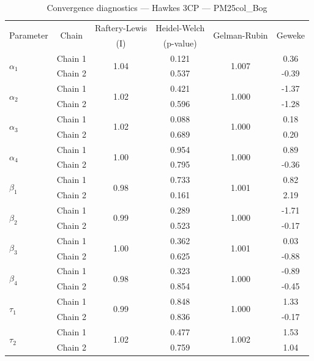 \begin{table}[H]
\centering
\caption{Convergence diagnostics — Hawkes 3CP — PM25col_Bog}
\begin{tabular}{lccccc}
\toprule
\multirow{2}{*}{Parameter} & \multirow{2}{*}{Chain} & Raftery-Lewis & Heidel-Welch & \multirow{2}{*}{Gelman-Rubin} & \multirow{2}{*}{Geweke} \\
 & & (I) & (p-value) & & (z) \\
\midrule
\multirow{2}{*}{$\alpha_1$} & Chain 1 & \multirow{2}{*}{1.04} & 0.121 & \multirow{2}{*}{1.007} & 0.36 \\
 & Chain 2 & & 0.537 & & -0.39 \\
\multirow{2}{*}{$\alpha_2$} & Chain 1 & \multirow{2}{*}{1.02} & 0.421 & \multirow{2}{*}{1.000} & -1.37 \\
 & Chain 2 & & 0.596 & & -1.28 \\
\multirow{2}{*}{$\alpha_3$} & Chain 1 & \multirow{2}{*}{1.02} & 0.088 & \multirow{2}{*}{1.000} & 0.18 \\
 & Chain 2 & & 0.689 & & 0.20 \\
\multirow{2}{*}{$\alpha_4$} & Chain 1 & \multirow{2}{*}{1.00} & 0.954 & \multirow{2}{*}{1.000} & 0.89 \\
 & Chain 2 & & 0.795 & & -0.36 \\
\midrule
\multirow{2}{*}{$\beta_1$} & Chain 1 & \multirow{2}{*}{0.98} & 0.733 & \multirow{2}{*}{1.001} & 0.82 \\
 & Chain 2 & & 0.161 & & 2.19 \\
\multirow{2}{*}{$\beta_2$} & Chain 1 & \multirow{2}{*}{0.99} & 0.289 & \multirow{2}{*}{1.000} & -1.71 \\
 & Chain 2 & & 0.523 & & -0.17 \\
\multirow{2}{*}{$\beta_3$} & Chain 1 & \multirow{2}{*}{1.00} & 0.362 & \multirow{2}{*}{1.001} & 0.03 \\
 & Chain 2 & & 0.625 & & -0.88 \\
\multirow{2}{*}{$\beta_4$} & Chain 1 & \multirow{2}{*}{0.98} & 0.323 & \multirow{2}{*}{1.000} & -0.89 \\
 & Chain 2 & & 0.854 & & -0.45 \\
\midrule
\multirow{2}{*}{$\tau_1$} & Chain 1 & \multirow{2}{*}{0.99} & 0.848 & \multirow{2}{*}{1.000} & 1.33 \\
 & Chain 2 & & 0.836 & & -0.17 \\
\multirow{2}{*}{$\tau_2$} & Chain 1 & \multirow{2}{*}{1.02} & 0.477 & \multirow{2}{*}{1.002} & 1.53 \\
 & Chain 2 & & 0.759 & & 1.04 \\

\end{tabular}
\end{table}
